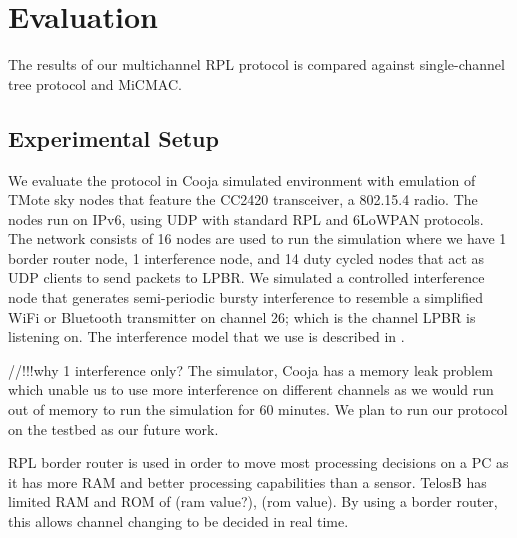 \section{Evaluation}
The results of our multichannel RPL protocol is compared against single-channel tree protocol and MiCMAC.

\subsection{Experimental Setup}
We evaluate the protocol in Cooja simulated environment with emulation of TMote sky nodes that feature the CC2420 transceiver, a 802.15.4 radio. The nodes run on IPv6, using UDP with standard RPL and 6LoWPAN protocols. The network consists of 16 nodes are used to run the simulation where we have 1 border router node, 1 interference node, and 14 duty cycled nodes that act as UDP clients to send packets to LPBR. We simulated a controlled interference node that generates semi-periodic bursty interference to resemble a simplified WiFi or Bluetooth transmitter on channel 26; which is the channel LPBR is listening on. The interference model that we use is described in \cite{Boano:2010:MSM:2127940.2127963}. 

//!!!why 1 interference only?
The simulator, Cooja has a memory leak problem which unable us to use more interference on different channels as we would run out of memory to run the simulation for 60 minutes. We plan to run our protocol on the testbed as our future work.

RPL border router is used in order to move most processing decisions on a PC as it has more RAM and better processing capabilities than a sensor. TelosB has limited RAM and ROM of (ram value?), (rom value). By using a border router, this allows channel changing to be decided in real time. 




